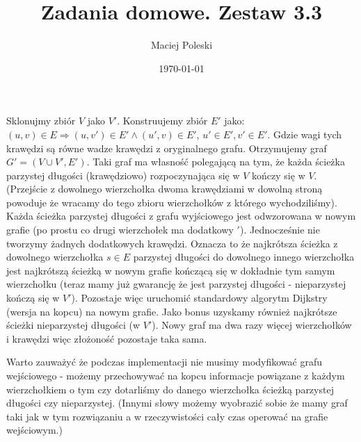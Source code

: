 \documentclass[a4paper,12pt]{article}
\title{Zadania domowe. Zestaw 3.3}
\author{Maciej Poleski}
\date{\today}
\begin{document}
\maketitle

\newpage

\section{}
Sklonujmy zbiór $V$ jako $V'$. Konstruujemy zbiór $E'$ jako: $(u,v)\in{E} \Rightarrow (u,v')\in{E'} \wedge (u',v)\in{E'}$, $u'\in{E'}, v'\in{E'}$. Gdzie wagi tych krawędzi są równe wadze krawędzi z oryginalnego grafu. Otrzymujemy graf $G'=(V\cup{V'},E')$. Taki graf ma własność polegającą na tym, że każda ścieżka parzystej długości (krawędziowo) rozpoczynająca się w $V$ kończy się w $V$. (Przejście z dowolnego wierzchołka dwoma krawędziami w dowolną stroną powoduje że wracamy do tego zbioru wierzchołków z którego wychodziliśmy). Każda ścieżka parzystej długości z grafu wyjściowego jest odwzorowana w nowym grafie (po prostu co drugi wierzchołek ma dodatkowy $'$). Jednocześnie nie tworzymy żadnych dodatkowych krawędzi. Oznacza to że najkrótsza ścieżka z dowolnego wierzchołka $s\in{E}$ parzystej długości do dowolnego innego wierzchołka jest najkrótszą ścieżką w nowym grafie kończącą się w dokładnie tym samym wierzchołku (teraz mamy już gwarancję że jest parzystej długości - nieparzystej kończą się w $V'$). Pozostaje więc uruchomić standardowy algorytm Dijkstry (wersja na kopcu) na nowym grafie. Jako bonus uzyskamy również najkrótsze ścieżki nieparzystej długości (w $V'$). Nowy graf ma dwa razy więcej wierzchołków i krawędzi więc złożoność pozostaje taka sama.

Warto zauważyć że podczas implementacji nie musimy modyfikować grafu wejściowego - możemy przechowywać na kopcu informacje powiązane z każdym wierzchołkiem o tym czy dotarliśmy do danego wierzchołka ścieżką parzystej długości czy nieparzystej. (Innymi słowy możemy wyobrazić sobie że mamy graf taki jak w tym rozwiązaniu a w rzeczywistości cały czas operować na grafie wejściowym.)
\end{document}
